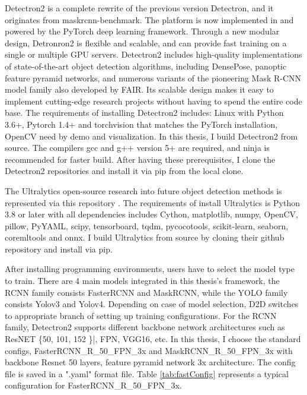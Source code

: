 Detectron2 is a complete rewrite of the previous version Detectron, and it originates from maskrcnn-benchmark. The platform is now implemented in and powered by the PyTorch deep learning framework. Through a new modular design, Detronron2 is flexible and scalable, and can provide fast training on a single or multiple GPU servers. Detectron2 includes high-quality implementations of state-of-the-art object detection algorithms, including DensePose, panoptic feature pyramid networks, and numerous variants of the pioneering Mask R-CNN model family also developed by FAIR. Its scalable design makes it easy to implement cutting-edge research projects without having to spend the entire code base. The requirements of installing Detectron2 includes: Linux with Python 3.6+, Pytorch 1.4+ and torchvision that matches the PyTorch installation, OpenCV need by demo and visualization. In this thesis, I build Detectron2 from source. The compilers gcc and g++ version 5+ are required, and ninja is recommended for faster build. After having these prerequisites, I clone the Detectron2 repositories and install it via pip from the local clone.

The Ultralytics open-source research into future object detection methods is represented via this repository \cite{ultralytics}. The requirements of install Ultralytics is Python 3.8 or later with all dependencies includes Cython, matplotlib, numpy, OpenCV, pillow, PyYAML, scipy, tensorboard, tqdm, pycocotools, scikit-learn, seaborn, coremltools and onnx. I build Ultralytics from source by cloning their github repository and install via pip.

After installing programming environments, users have to select the model type to train. There are 4 main models integrated in this thesis's framework, the RCNN family consists FasterRCNN and MaskRCNN, while the YOLO family consists Yolov3 and Yolov4. Depending on case of model selection, D2D switches to appropriate branch of setting up training configurations. For the RCNN family, Detectron2 supports different backbone network architectures such as ResNET \{50, 101, 152 \}|, FPN, VGG16, etc. In this thesis, I choose the standard configs, FasterRCNN\_R\_50\_FPN\_3x and MaskRCNN\_R\_50\_FPN\_3x with backbone Resnet 50 layers, feature pyramid network 3x architecture. The config file is saved in a ".yaml" format file. Table \ref{tab:fastConfig} represents a typical configuration for FasterRCNN\_R\_50\_FPN\_3x.

